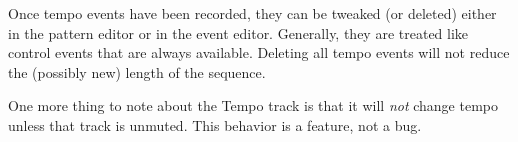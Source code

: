 Once tempo events have been recorded, they can be tweaked (or deleted)
either in the pattern editor or in the event editor.  Generally, they are
treated like control events that are always available.  Deleting all tempo
events will not reduce the (possibly new) length of the sequence.

One more thing to note about the Tempo track is that it will
\textsl{not} change tempo unless that track is unmuted.
This behavior is a feature, not a bug.


